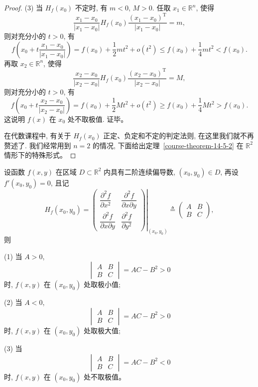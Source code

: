 \documentclass[12pt,fontset=fandol]{ctexart}
\begin{document}
\begin{proof}
\noindent (3) 当 $H_f(x_0)$ 不定时, 有 $m<0$, $M>0$. 任取 $x_1\in\mathbb R^n$, 使得
\[
  \frac{x_1-x_0}{|x_1-x_0|}
  H_f(x_0)
  \frac{(x_1-x_0)^{\mathrm T}}{|x_1-x_0|}
  =m,
\]
则对充分小的 $t>0$, 有
\[
  f\left(x_0+t\frac{x_1-x_0}{|x_1-x_0|}\right)
  =f(x_0)+\frac12mt^2+o(t^2)
  \leqslant f(x_0)+\frac14mt^2<f(x_0).
\]
再取 $x_2\in\mathbb R^n$, 使得
\[
  \frac{x_2-x_0}{|x_2-x_0|}
  H_f(x_0)
  \frac{(x_2-x_0)^{\mathrm T}}{|x_2-x_0|}
  =M,
\]
则对充分小的 $t>0$, 有
\[
  f\left(x_0+t\frac{x_2-x_0}{|x_2-x_0|}\right)
  =f(x_0)+\frac12Mt^2+o(t^2)
  \geqslant f(x_0)+\frac14Mt^2>f(x_0).
\]
这说明 $f(x)$ 在 $x_0$ 处不取极值. 证毕。

在代数课程中, 有关于 $H_f(x_0)$ 正定、负定和不定的判定法则, 在这里我们就不再赘述了. 我们经常用到 $n=2$ 的情况, 下面给出定理~\ref{course-theorem-14-5-2}  在 $\mathbb R^2$ 情形下的特殊形式。

\end{proof}
\noindent{}\quad 设函数 $f(x,y)$ 在区域 $D\subset\mathbb R^2$ 内具有二阶连续偏导数, $(x_0,y_0)\in D$, 再设 $f'(x_0,y_0)=0$, 且记
\[
  H_f(x_0,y_0)
  =
  \left.
  \begin{pmatrix}
    \dfrac{\partial^2 f}{\partial x^2} &
    \dfrac{\partial^2 f}{\partial x\partial y}\\
    \dfrac{\partial^2 f}{\partial x\partial y} &
    \dfrac{\partial^2 f}{\partial y^2}
  \end{pmatrix}
  \right|_{(x_0,y_0)}
  \triangleq
  \begin{pmatrix}
    A & B\\
    B & C
  \end{pmatrix},
\]
则

\noindent (1) 当 $A>0$,
\[
  \begin{vmatrix}
    A & B\\
    B & C
  \end{vmatrix}
  =AC-B^2>0
\]
时, $f(x,y)$ 在 $(x_0,y_0)$ 处取极小值;

\noindent (2) 当 $A<0$,
\[
  \begin{vmatrix}
    A & B\\
    B & C
  \end{vmatrix}
  =AC-B^2>0
\]
时, $f(x,y)$ 在 $(x_0,y_0)$ 处取极大值;

\noindent (3) 当
\[
  \begin{vmatrix}
    A & B\\
    B & C
  \end{vmatrix}
  =AC-B^2<0
\]
时, $f(x,y)$ 在 $(x_0,y_0)$ 处不取极值。
\end{document}
